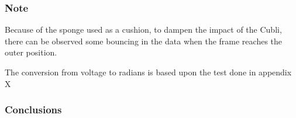 \begin{minipage}{\linewidth}
\begin{minipage}{0.45\linewidth}
\begin{figure}[H]
			\centering
			\vspace{-.4cm}
			\captionsetup{justification=centering}
			\label{graphFallResponsRad}
		\end{figure}\vspace{-5mm}
	\end{minipage}
\end{minipage} 

%
%
%

\subsubsection{Note}
Because of the sponge used as a cushion, to dampen the impact of the Cubli, there can be observed some bouncing in the data when the frame reaches the outer position.

The conversion from voltage to radians is based upon the test done in appendix X

\subsubsection{Conclusions}

